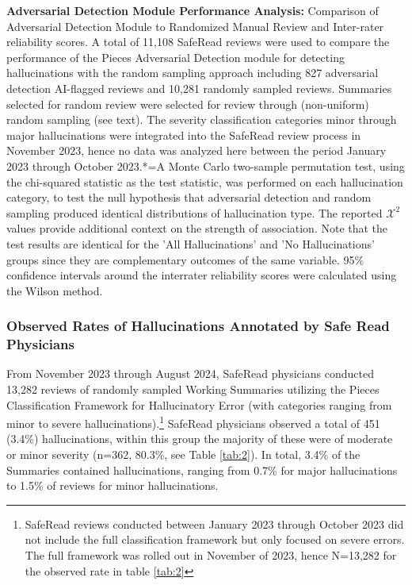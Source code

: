 \documentclass{style/myclass}
\begin{document}
\begin{table}
\caption{\textbf{Adversarial Detection Module Performance Analysis:} Comparison of Adversarial Detection Module to Randomized Manual Review and Inter-rater reliability scores. A total of 11,108 SafeRead reviews were used to compare the performance of the Pieces Adversarial Detection module for detecting hallucinations with the random sampling approach including 827 adversarial detection AI-flagged reviews and 10,281 randomly sampled reviews. Summaries selected for random review were selected for review through (non-uniform) random sampling (see text). The severity classification categories minor through major hallucinations were integrated into the SafeRead review process in November 2023, hence no data was analyzed here between the period January 2023 through October 2023.*=A Monte Carlo two-sample permutation test, using the chi-squared statistic as the test statistic, was performed on each hallucination category, to test the null hypothesis that adversarial detection and random sampling produced identical distributions of hallucination type. The reported $\mathcal{X}^2$ values provide additional context on the strength of association. Note that the test results are identical for the 'All Hallucinations' and 'No Hallucinations' groups since they are complementary outcomes of the same variable. 95\% confidence intervals around the interrater reliability scores were calculated using the Wilson method. \cite{10}}
\label{tab:2}
\end{table}


\subsubsection{ Observed Rates of Hallucinations Annotated by Safe Read Physicians}

From November 2023 through August 2024, SafeRead physicians conducted 13,282 reviews of randomly sampled Working Summaries utilizing the Pieces Classification Framework for Hallucinatory Error (with categories ranging from minor to severe hallucinations).\footnote{ SafeRead reviews conducted between January 2023 through October 2023 did not include the full classification framework but only focused on severe errors. The full framework was rolled out in November of 2023, hence N=13,282 for the observed rate in table \ref{tab:2}} SafeRead physicians observed a total of 451 (3.4\%) hallucinations, within this group the majority of these were of moderate or minor severity (n=362, 80.3\%, see Table \ref{tab:2}). In total, 3.4\% of the Summaries contained hallucinations, ranging from 0.7\% for major hallucinations to 1.5\% of reviews for minor hallucinations.
\end{document}
